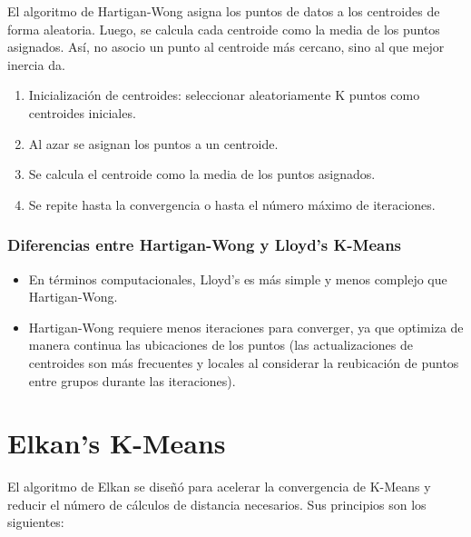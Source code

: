 El algoritmo de Hartigan-Wong asigna los puntos de datos a los centroides de forma aleatoria. Luego, se calcula cada centroide como la media de los puntos asignados. Así, no asocio un punto al centroide más cercano, sino al que mejor inercia da.


\begin{enumerate}
    \item Inicialización de centroides: seleccionar aleatoriamente K puntos como centroides iniciales.

    \item Al azar se asignan los puntos a un centroide.

    \item Se calcula el centroide como la media de los puntos asignados.

    \item Se repite hasta la convergencia o hasta el número máximo de iteraciones.
\end{enumerate}

\subsubsection{Diferencias entre Hartigan-Wong y Lloyd's K-Means}

\begin{itemize}
    \item En términos computacionales, Lloyd's es más simple y menos complejo que Hartigan-Wong.

    \item Hartigan-Wong requiere menos iteraciones para converger, ya que optimiza de manera continua las ubicaciones de los puntos (las actualizaciones de centroides son más frecuentes y locales al considerar la reubicación de puntos entre grupos durante las iteraciones).
\end{itemize}



\section{Elkan's K-Means}
El algoritmo de Elkan se diseñó para acelerar la convergencia de K-Means y reducir el número de cálculos de distancia necesarios. Sus principios son los siguientes:

